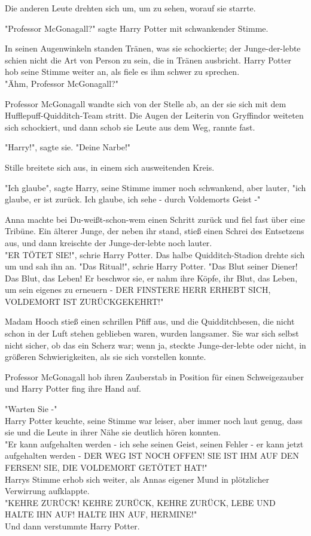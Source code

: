 {Die anderen Leute drehten sich um, um zu sehen, worauf sie starrte.

"Professor McGonagall?" sagte Harry Potter mit schwankender Stimme.

In seinen Augenwinkeln standen Tränen, was sie schockierte; der Junge-der-lebte schien nicht die Art von Person zu sein, die in Tränen ausbricht. Harry Potter hob seine Stimme weiter an, als fiele es ihm schwer zu sprechen.\\ "Ähm, Professor McGonagall?"

Professor McGonagall wandte sich von der Stelle ab, an der sie sich mit dem Hufflepuff-Quidditch-Team stritt. Die Augen der Leiterin von Gryffindor weiteten sich schockiert, und dann schob sie Leute aus dem Weg, rannte fast.

"Harry!", sagte sie. "Deine Narbe!"

Stille breitete sich aus, in einem sich ausweitenden Kreis.

"Ich glaube", sagte Harry, seine Stimme immer noch schwankend, aber lauter, "ich glaube, er ist zurück. Ich glaube, ich sehe - durch Voldemorts Geist -"

Anna machte bei Du-weißt-schon-wem einen Schritt zurück und fiel fast über eine Tribüne. Ein älterer Junge, der neben ihr stand, stieß einen Schrei des Entsetzens aus, und dann kreischte der Junge-der-lebte noch lauter.\\ "ER TÖTET SIE!", schrie Harry Potter. Das halbe Quidditch-Stadion drehte sich um und sah ihn an. "Das Ritual!", schrie Harry Potter. "Das Blut seiner Diener! Das Blut, das Leben! Er beschwor sie, er nahm ihre Köpfe, ihr Blut, das Leben, um sein eigenes zu erneuern - DER FINSTERE HERR ERHEBT SICH, VOLDEMORT IST ZURÜCKGEKEHRT!"

Madam Hooch stieß einen schrillen Pfiff aus, und die Quidditchbesen, die nicht schon in der Luft stehen geblieben waren, wurden langsamer. Sie war sich selbst nicht sicher, ob das ein Scherz war; wenn ja, steckte Junge-der-lebte oder nicht, in größeren Schwierigkeiten, als sie sich vorstellen konnte.

Professor McGonagall hob ihren Zauberstab in Position für einen Schweigezauber und Harry Potter fing ihre Hand auf.

"Warten Sie -"\\ Harry Potter keuchte, seine Stimme war leiser, aber immer noch laut genug, dass sie und die Leute in ihrer Nähe sie deutlich hören konnten.\\ "Er kann aufgehalten werden - ich sehe seinen Geist, seinen Fehler - er kann jetzt aufgehalten werden - DER WEG IST NOCH OFFEN! SIE IST IHM AUF DEN FERSEN! SIE, DIE VOLDEMORT GETÖTET HAT!"\\ Harrys Stimme erhob sich weiter, als Annas eigener Mund in plötzlicher Verwirrung aufklappte.\\ "KEHRE ZURÜCK! KEHRE ZURÜCK, KEHRE ZURÜCK, LEBE UND HALTE IHN AUF! HALTE IHN AUF, HERMINE!"\\ Und dann verstummte Harry Potter.

}
